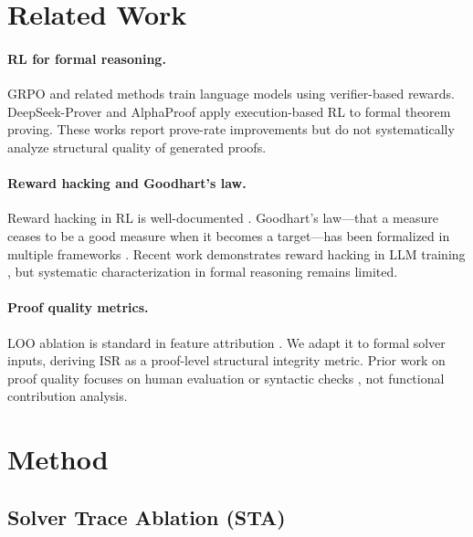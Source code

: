 \documentclass[11pt]{article}
\begin{document}
\section{Related Work}

\paragraph{RL for formal reasoning.} GRPO \cite{shao2024deepseekmath} and related methods \cite{deepseek-r1,luong2024reft} train language models using verifier-based rewards. DeepSeek-Prover \cite{xin2024deepseekprover} and AlphaProof \cite{trinh2024alphageometry} apply execution-based RL to formal theorem proving. These works report prove-rate improvements but do not systematically analyze structural quality of generated proofs.

\paragraph{Reward hacking and Goodhart's law.} Reward hacking in RL is well-documented \cite{amodei2016concrete,skalse2022defining}. Goodhart's law---that a measure ceases to be a good measure when it becomes a target---has been formalized in multiple frameworks \cite{manheim2019categorizing}. Recent work demonstrates reward hacking in LLM training \cite{gao2023scaling,coste2024reward}, but systematic characterization in formal reasoning remains limited.

\paragraph{Proof quality metrics.} LOO ablation is standard in feature attribution \cite{lei2016rationalizing,deyoung2020eraser}. We adapt it to formal solver inputs, deriving ISR as a proof-level structural integrity metric. Prior work on proof quality focuses on human evaluation \cite{jiang2023draft} or syntactic checks \cite{first2023baldur}, not functional contribution analysis.

\section{Method}

\subsection{Solver Trace Ablation (STA)}
\end{document}
